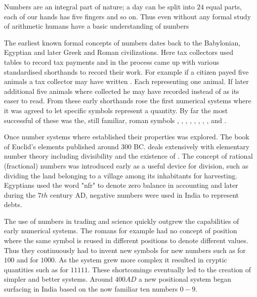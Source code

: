 





Numbers are an integral part of nature; a day can be split into $24$ equal parts, each of our hands has five fingers and so on. Thus even without any formal study of arithmetic humans have a basic understanding of numbers

\myindent The earliest known formal concepts of numbers dates back to the Babylonian, Egyptian and later Greek and Roman civilizations. Here tax collectors used tables to record tax payments and in the process came up with various standardised shorthands to record their work. For example if a citizen payed five animals a tax collector may have written . Each  representing one animal. If later additional five animals where collected he may have recorded  instead of  as its easer to read. From these early shorthands rose the first numerical systems where it was agreed to let specific symbols represent a quantity. By far the most successful of these was the, still familiar, roman symbols , , , , , , , ,  and . 

\myindent Once number systems where established their properties was explored. The  book of Euclid's elements published around 300 BC. deals extensively with elementary number theory including divisibility and the existence of . The concept of rational (fractional) numbers was introduced early as a useful device for division, such as dividing the land belonging to a village among its inhabitants for harvesting. Egyptians used the word "nfr" to denote zero balance in accounting and later during the $7th$ century AD, negative numbers were used in India to represent debts.

\myindent The use of numbers in trading and science quickly outgrew the capabilities of early numerical systems. The romans for example had no concept of position where the same symbol is reused in different positions to denote different values. Thus they continuously had to invent new symbols for new numbers such as  for $100$ and  for $1000$. As the system grew more complex it resulted in cryptic quantities such as  for $11111$. These shortcomings eventually led to the creation of simpler and better systems. Around $400 AD$ a new positional system began surfacing in India based on the now familiar ten numbers $0-9$. 

